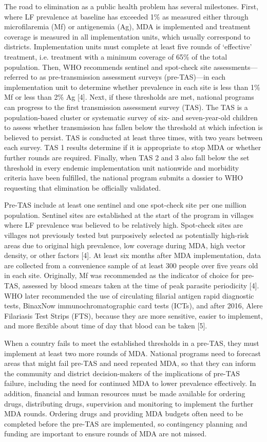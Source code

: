 \documentclass[11pt,a4paper]{article}
\begin{document}
The road to elimination as a public health problem has several milestones. First, where LF prevalence at baseline has exceeded 1\% as measured either through microfilaremia (Mf) or antigenemia (Ag), MDA is implemented and treatment coverage is measured in all implementation units, which usually correspond to districts. Implementation units must complete at least five rounds of ‘effective’ treatment, i.e. treatment with a minimum coverage of 65\% of the total population. Then, WHO recommends sentinel and spot-check site assessments—referred to as pre-transmission assessment surveys (pre-TAS)—in each implementation unit to determine whether prevalence in each site is less than 1\% Mf or less than 2\% Ag [4]. Next, if these thresholds are met, national programs can progress to the first transmission assessment survey (TAS). The TAS is a population-based cluster or systematic survey of six- and seven-year-old children to assess whether transmission has fallen below the threshold at which infection is believed to persist. TAS is conducted at least three times, with two years between each survey. TAS 1 results determine if it is appropriate to stop MDA or whether further rounds are required. Finally, when TAS 2 and 3 also fall below the set threshold in every endemic implementation unit nationwide and morbidity criteria have been fulfilled, the national program submits a dossier to WHO requesting that elimination be officially validated.

Pre-TAS include at least one sentinel and one spot-check site per one million population. Sentinel sites are established at the start of the program in villages where LF prevalence was believed to be relatively high. Spot-check sites are villages not previously tested but purposively selected as potentially high-risk areas due to original high prevalence, low coverage during MDA, high vector density, or other factors [4]. At least six months after MDA implementation, data are collected from a convenience sample of at least 300 people over five years old in each site. Originally, Mf was recommended as the indicator of choice for pre-TAS, assessed by blood smears taken at the time of peak parasite periodicity [4]. WHO later recommended the use of circulating filarial antigen rapid diagnostic tests, BinaxNow immunochromatographic card tests (ICTs), and after 2016, Alere Filariasis Test Strips (FTS), because they are more sensitive, easier to implement, and more flexible about time of day that blood can be taken [5].

When a country fails to meet the established thresholds in a pre-TAS, they must implement at least two more rounds of MDA. National programs need to forecast areas that might fail pre-TAS and need repeated MDA, so that they can inform the community and district decision-makers of the implications of pre-TAS failure, including the need for continued MDA to lower prevalence effectively. In addition, financial and human resources must be made available for ordering drugs, distributing drugs, supervision and monitoring to implement the further MDA rounds. Ordering drugs and providing MDA budgets often need to be completed before the pre-TAS are implemented, so contingency planning and funding are important to ensure rounds of MDA are not missed.
\end{document}
